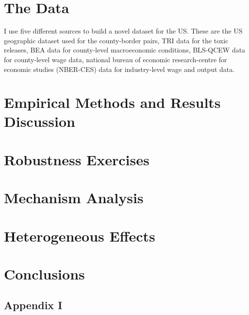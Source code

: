 \documentclass[12pt, english]{article}
\begin{document}
    \section{The Data}\label{sec:data-and-methods}
    I use five different sources to build a novel dataset for the US. These are the US geographic dataset used for the county-border pairs, TRI data for the toxic releases, BEA data for county-level macroeconomic conditions, BLS-QCEW data for county-level wage data, national bureau of economic research-centre for economic studies (NBER-CES) data for industry-level wage and output data.


    \section{Empirical Methods and Results Discussion}\label{sec:empirical-methods-and-results-discussion}


    \section{Robustness Exercises}\label{sec:robustness-exercises}


    \section{Mechanism Analysis}\label{sec:mechanism-analysis}


    \section{Heterogeneous Effects}\label{sec:heterogeneous-effects}


    \section{Conclusions}\label{sec:conclusions}

    \newpage
    \begin{appendices}
        \section*{Appendix I}\label{sec:appendix-i}
        
    \end{appendices}

\end{document}
